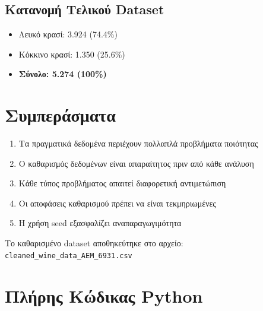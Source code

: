 \documentclass[12pt,a4paper]{article}
\begin{document}
\subsection{\textgreek{Κατανομή Τελικού Dataset}}

\begin{itemize}
    \item \textgreek{Λευκό κρασί: 3.924 (74.4\%)}
    \item \textgreek{Κόκκινο κρασί: 1.350 (25.6\%)}
    \item \textbf{\textgreek{Σύνολο: 5.274 (100\%)}}
\end{itemize}

\section{\textgreek{Συμπεράσματα}}

\begin{enumerate}
    \item \textgreek{Τα πραγματικά δεδομένα περιέχουν πολλαπλά προβλήματα ποιότητας}
    \item \textgreek{Ο καθαρισμός δεδομένων είναι απαραίτητος πριν από κάθε ανάλυση}
    \item \textgreek{Κάθε τύπος προβλήματος απαιτεί διαφορετική αντιμετώπιση}
    \item \textgreek{Οι αποφάσεις καθαρισμού πρέπει να είναι τεκμηριωμένες}
    \item \textgreek{Η χρήση seed εξασφαλίζει αναπαραγωγιμότητα}
\end{enumerate}

\textgreek{Το καθαρισμένο dataset αποθηκεύτηκε στο αρχείο:} \texttt{cleaned\_wine\_data\_AEM\_6931.csv}

\newpage
\appendix
\section{\textgreek{Πλήρης Κώδικας Python}}
\end{document}
